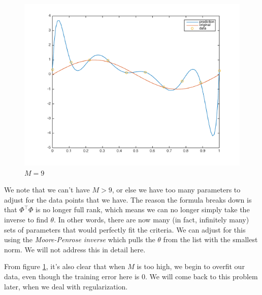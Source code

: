 \documentclass[11pt,letterpaper]{article}
\begin{document}
\begin{figure}[h!]
  \caption{$M = 3$}\label{fig:basism3}
\endminipage\hfill
{}
  \includegraphics[width=\linewidth]{figures/basism9.png}
  \caption{$M = 9$}\label{fig:basism9}
\endminipage
\end{figure}

We note that we can't have $M > 9$, or else we have too many parameters to adjust for the data points that we have. The reason the formula breaks down is that $\Phi^\intercal\Phi$ is no longer full rank, which means we can no longer simply take the inverse to find $\theta$. In other words, there are now many (in fact, infinitely many) sets of parameters that would perfectly fit the criteria. We can adjust for this using the \textit{Moore-Penrose inverse} which pulls the $\theta$ from the list with the smallest norm. We will not address this in detail here.

From figure \ref{fig:basism9}, it's also clear that when $M$ is too high, we begin to overfit our data, even though the training error here is $0$. We will come back to this problem later, when we deal with regularization.
\end{document}
